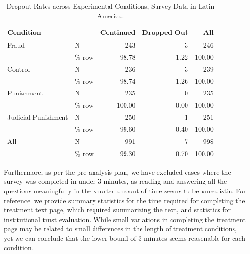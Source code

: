 \documentclass[11pt, ngerman,english,a4]{article}
\begin{document}
\begin{table}[!htbp]
\centering
\caption{Dropout Rates across Experimental Conditions, Survey Data in Latin America.} 
\begin{tabular}[t]{llrrr}
\toprule
Condition &   & Continued & Dropped Out & All\\
\midrule
Fraud & N & 243 & 3 & 246\\
 & \% row & 98.78 & 1.22 & 100.00\\
Control & N & 236 & 3 & 239\\
 & \% row & 98.74 & 1.26 & 100.00\\
Punishment & N & 235 & 0 & 235\\
 & \% row & 100.00 & 0.00 & 100.00\\
Judicial Punishment & N & 250 & 1 & 251\\
 & \% row & 99.60 & 0.40 & 100.00\\
All & N & 991 & 7 & 998\\
 & \% row & 99.30 & 0.70 & 100.00\\
\bottomrule
\end{tabular}
\end{table}

\vspace{1cm}

Furthermore, as per the pre-analysis plan, we have excluded cases where the survey was completed in under 3 minutes, as reading and answering all the questions meaningfully in the shorter amount of time seems to be unrealistic.
For reference, we provide summary statistics for the time required for completing the treatment text page, which required summarizing the text, and statistics for institutional trust evaluation. While small variations in completing the treatment page may be related to small differences in the length of treatment conditions, yet we can conclude that the lower bound of 3 minutes seems reasonable for each condition. 

\end{document}
